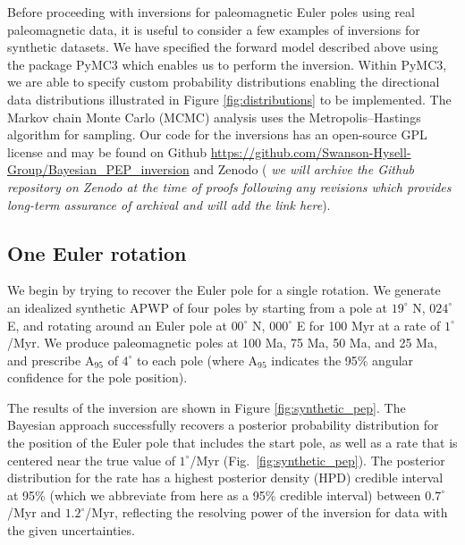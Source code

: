 \documentclass[11pt,letterpaper]{article}
\begin{document}
Before proceeding with inversions for paleomagnetic Euler poles using real paleomagnetic data, it is useful to consider a few examples of inversions for synthetic datasets. We have specified the forward model described above using the package PyMC3 \citep{Salvatier2016a} which enables us to perform the inversion. Within PyMC3, we are able to specify custom probability distributions enabling the directional data distributions illustrated in Figure \ref{fig:distributions} to be implemented. The Markov chain Monte Carlo (MCMC) analysis uses the Metropolis–Hastings algorithm for sampling. Our code for the inversions has an open-source GPL license and may be found on Github \url{https://github.com/Swanson-Hysell-Group/Bayesian_PEP_inversion} and Zenodo ( \textit{we will archive the Github repository on Zenodo at the time of proofs following any revisions which provides long-term assurance of archival and will add the link here}).


\subsection*{One Euler rotation}
\label{sec:one_stage_pole}
We begin by trying to recover the Euler pole for a single rotation. We generate an idealized synthetic APWP of four poles by starting from a pole at $19^\circ$ N, $024^\circ$ E, and rotating around an Euler pole at $00^\circ$ N, $000^\circ$ E for 100 Myr at a rate of $1^\circ$/Myr. We produce paleomagnetic poles at 100 Ma, 75 Ma, 50 Ma, and 25 Ma, and prescribe A$_{95}$ of $4^\circ$ to each pole (where A$_{95}$ indicates the 95\% angular confidence for the pole position).

The results of the inversion are shown in Figure \ref{fig:synthetic_pep}. The Bayesian approach successfully recovers a posterior probability distribution for the position of the Euler pole that includes the start pole, as well as a rate that is centered near the true value of $1^\circ$/Myr (Fig.~\ref{fig:synthetic_pep}). The posterior distribution for the rate has a highest posterior density (HPD) credible interval at 95\% (which we abbreviate from here as a 95\% credible interval) between $0.7^\circ$/Myr and $1.2^\circ$/Myr, reflecting the resolving power of the inversion for data with the given uncertainties.
\end{document}

